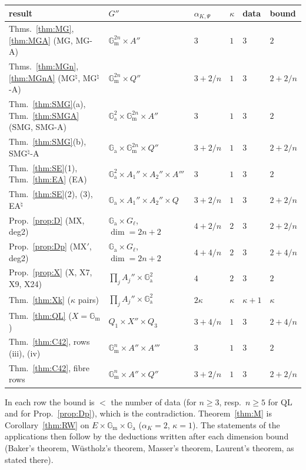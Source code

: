 \documentclass[11pt]{amsart}
\theoremstyle{definition}
\newcommand{\Ga}{\mathbb{G}_{\mathrm a}}
\newcommand{\Gm}{\mathbb{G}_{\mathrm m}}
\begin{document}
\begin{center}
{\small
\begin{tabular}{>{\raggedright\arraybackslash}p{4.4cm}>{\raggedright\arraybackslash}p{4.2cm}lllp{1.6cm}}
result & $G''$ & $\alpha_{K,\Psi}$ & $\kappa$ & data & bound\\\hline
Thms.~\ref{thm:MG}, \ref{thm:MGA} (MG, MG-A) & $\Gm^{2n}\times A''$ & $3$ & $1$ & $3$ & $2$\\
Thms.~\ref{thm:MGn}, \ref{thm:MGnA} (MG$^\natural$, MG$^\natural$-A) & $\Gm^{2n}\times Q''$ & $3+2/n$ & $1$ & $3$ & $2+2/n$\\
Thm.~\ref{thm:SMG}(a), Thm.~\ref{thm:SMGA} (SMG, SMG-A) & $\Ga^2\times\Gm^{2n}\times A''$ & $3$ & $1$ & $3$ & $2$\\
Thm.~\ref{thm:SMG}(b), SMG$^\natural$-A & $\Ga\times\Gm^{2n}\times Q''$ & $3+2/n$ & $1$ & $3$ & $2+2/n$\\
Thm.~\ref{thm:SE}(1), Thm.~\ref{thm:EA} (EA) & $\Ga^2\times A_1''\times A_2''\times A'''$ & $3$ & $1$ & $3$ & $2$\\
Thm.~\ref{thm:SE}(2), (3), EA$^\natural$ & $\Ga\times A_1''\times A_2''\times Q$ & $3+2/n$ & $1$ & $3$ & $2+2/n$\\
Prop.~\ref{prop:D} (MX, deg2) & $\Ga\times G_\ell$, $\dim=2n+2$ & $4+2/n$ & $2$ & $3$ & $2+2/n$\\
Prop.~\ref{prop:Dp} (MX$'$, deg2) & $\Ga\times G_\ell$, $\dim=2n+2$ & $4+4/n$ & $2$ & $3$ & $2+4/n$\\
Prop.~\ref{prop:X} (X, X7, X9, X24) & $\prod_jA_j''\times\Ga^2$ & $4$ & $2$ & $3$ & $2$\\
Thm.~\ref{thm:Xk} ($\kappa$ pairs) & $\prod_jA_j''\times\Ga^2$ & $2\kappa$ & $\kappa$ & $\kappa+1$ & $\kappa$\\
Thm.~\ref{thm:QL} ($X=\Gm$) & $Q_1\times X''\times Q_3$ & $3+4/n$ & $1$ & $3$ & $2+4/n$\\
Thm.~\ref{thm:C42}, rows (iii), (iv) & $\Gm^n\times A''\times A'''$ & $3$ & $1$ & $3$ & $2$\\
Thm.~\ref{thm:C42}, fibre rows & $\Gm^n\times A''\times Q''$ & $3+2/n$ & $1$ & $3$ & $2+2/n$
\end{tabular}
}
\end{center}

\noindent In each row the bound is $<$ the number of data (for $n\ge3$, resp.\ $n\ge5$ for QL and for Prop.~\ref{prop:Dp}), which is the contradiction.
Theorem~\ref{thm:M} is Corollary~\ref{thm:RW} on $E\times\Gm\times\Ga$ ($\alpha_K=2$, $\kappa=1$). The statements of the
applications then follow by the deductions written after each dimension bound (Baker's theorem, W\"ustholz's theorem,
Masser's theorem, Laurent's theorem, as stated there).
\end{document}
